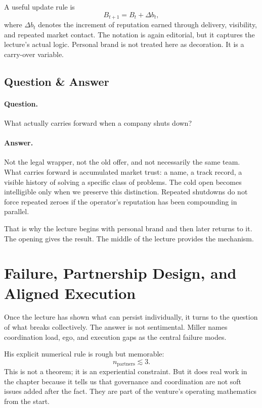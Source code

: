 A useful update rule is
\begin{equation}
B_{t+1}=B_t+\Delta b_t,
\end{equation}
where \(\Delta b_t\) denotes the increment of reputation earned through delivery, visibility, and repeated market contact. The notation is again editorial, but it captures the lecture's actual logic. Personal brand is not treated here as decoration. It is a carry-over variable.

\subsection{Question \& Answer}

\paragraph{Question.} What actually carries forward when a company shuts down?

\paragraph{Answer.} Not the legal wrapper, not the old offer, and not necessarily the same team. What carries forward is accumulated market trust: a name, a track record, a visible history of solving a specific class of problems. The cold open becomes intelligible only when we preserve this distinction. Repeated shutdowns do not force repeated zeroes if the operator's reputation has been compounding in parallel.

That is why the lecture begins with personal brand and then later returns to it. The opening gives the result. The middle of the lecture provides the mechanism.

\section{Failure, Partnership Design, and Aligned Execution}

Once the lecture has shown what can persist individually, it turns to the question of what breaks collectively. The answer is not sentimental. Miller names coordination load, ego, and execution gaps as the central failure modes.

His explicit numerical rule is rough but memorable:
\begin{equation}
n_{\text{partners}} \lesssim 3.
\end{equation}
This is not a theorem; it is an experiential constraint. But it does real work in the chapter because it tells us that governance and coordination are not soft issues added after the fact. They are part of the venture's operating mathematics from the start.

